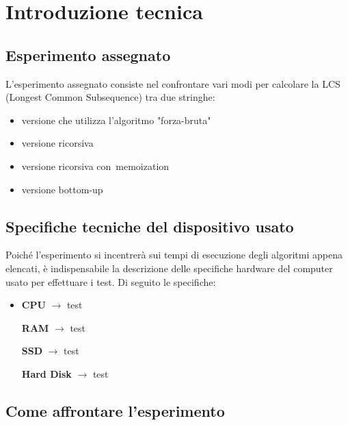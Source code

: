 \section{Introduzione tecnica}
	\subsection{Esperimento assegnato}
		L'esperimento assegnato consiste nel confrontare vari modi per calcolare la LCS (Longest Common Subsequence) tra due stringhe:
		\begin{itemize}
			\item versione che utilizza l'algoritmo "forza-bruta"
			\item versione ricorsiva
			\item versione ricorsiva con memoization
			\item versione bottom-up
		\end{itemize}
	
	\subsection{Specifiche tecniche del dispositivo usato}
		Poiché l'esperimento si incentrerà sui tempi di esecuzione degli algoritmi appena elencati, è indispensabile la descrizione delle specifiche hardware del computer usato per effettuare i test. Di seguito le specifiche:
			\begin{itemize}
				\item \textbf{CPU} $\rightarrow$ test
				\item[\textbf{RAM}] $\rightarrow$ test
				\item[\textbf{SSD}] $\rightarrow$ test
				\item[\textbf{Hard Disk}] $\rightarrow$ test
			\end{itemize}
	
	\subsection{Come affrontare l'esperimento}